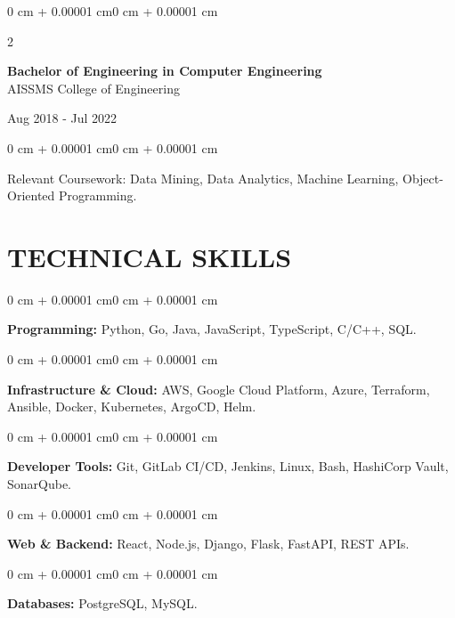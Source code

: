 \documentclass[10pt, letterpaper]{article}
\newenvironment{onecolentry}{
    \begin{adjustwidth}{0 cm + 0.00001 cm}{0 cm + 0.00001 cm}
}{
    \end{adjustwidth}
}
\newenvironment{twocolentry}[2][]{
    \onecolentry
    \def\secondColumn{#2}
    \setcolumnwidth{\fill, 4.5 cm}
    \begin{paracol}{2}
}{
    \switchcolumn \raggedleft \secondColumn
    \end{paracol}
    \endonecolentry
}
\begin{document}
\begin{twocolentry}{
    Aug 2018 - Jul 2022
}
    \textbf{Bachelor of Engineering in Computer Engineering} \\
    AISSMS College of Engineering
\end{twocolentry}
\begin{onecolentry}
Relevant Coursework: Data Mining, Data Analytics, Machine Learning, Object-Oriented Programming.
\end{onecolentry}
\section{TECHNICAL SKILLS}
\begin{onecolentry}
\textbf{Programming:} Python, Go, Java, JavaScript, TypeScript, C/C++, SQL.
\end{onecolentry}
\vspace{0.06 cm}
\begin{onecolentry}
\textbf{Infrastructure \& Cloud:} AWS, Google Cloud Platform, Azure, Terraform, Ansible, Docker, Kubernetes, ArgoCD, Helm.
\end{onecolentry}
\vspace{0.06 cm}
\begin{onecolentry}
\textbf{Developer Tools:} Git, GitLab CI/CD, Jenkins, Linux, Bash, HashiCorp Vault, SonarQube.
\end{onecolentry}
\vspace{0.06 cm}
\begin{onecolentry}
\textbf{Web \& Backend:} React, Node.js, Django, Flask, FastAPI, REST APIs.
\end{onecolentry}
\vspace{0.06 cm}
\begin{onecolentry}
\textbf{Databases:} PostgreSQL, MySQL.
\end{onecolentry}

\end{document}
